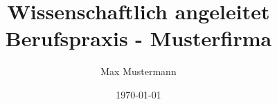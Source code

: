 %
%

\newcommand{\fullname}{Max Mustermann}
\newcommand{\email}{max.mustermann@stud-provadis-hochschule.de}
\newcommand{\matnr}{A123}
\newcommand{\telMobil}{+49 1234 567890}
\newcommand{\fakultaet}{Informatik und Wirtschaftsinformatik}

\newcommand{\titel}{Textvorlage für wissenschaftliche Arbeiten\\
	Titel und Untertitel der Arbeit}
\newcommand{\unternehmen}{Musterfirma}

\newcommand{\abgabedatum}{xx.xx.xxxx}

\newcommand{\refFirst}{Prof. Dr. First Last}
\newcommand{\refSecond}{Dr. First Last}

\title{Wissenschaftlich angeleitet Berufspraxis - \unternehmen}
\author{\fullname}
\date{\today}